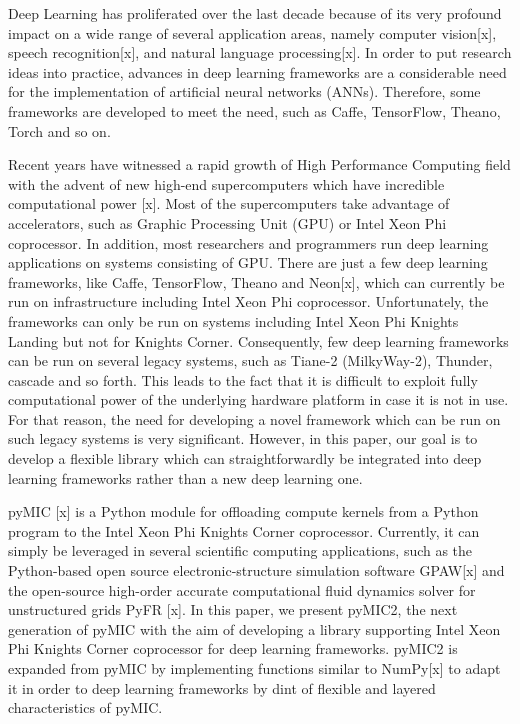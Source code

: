 Deep Learning has proliferated over the last decade because of its very profound impact on a wide range of several application areas, namely computer vision[x], speech recognition[x], and natural language processing[x]. In order to put research ideas into practice, advances in deep learning frameworks are a considerable need for the implementation of artificial neural networks (ANNs). Therefore, some frameworks are developed to meet the need, such as Caffe, TensorFlow, Theano, Torch and so on. 

Recent years have witnessed a rapid growth of High Performance Computing field with the advent of new high-end supercomputers which have incredible computational power [x]. Most of the supercomputers take advantage of accelerators, such as Graphic Processing Unit (GPU) or Intel Xeon Phi coprocessor. In addition, most researchers and programmers run deep learning applications on systems consisting of GPU. There are just a few deep learning frameworks, like Caffe, TensorFlow, Theano and Neon[x], which can currently be run on infrastructure including Intel Xeon Phi coprocessor. Unfortunately, the frameworks can only be run on systems including Intel Xeon Phi Knights Landing but not for Knights Corner. Consequently, few deep learning frameworks can be run on several legacy systems, such as Tiane-2 (MilkyWay-2), Thunder, cascade and so forth. This leads to the fact that it is difficult to exploit fully computational power of the underlying hardware platform in case it is not in use. For that reason, the need for developing a novel framework which can be run on such legacy systems is very significant. However, in this paper, our goal is to develop a flexible library which can straightforwardly be integrated into deep learning frameworks rather than a new deep learning one.

pyMIC [x] is a Python module for offloading compute kernels from a Python program to the Intel Xeon Phi Knights Corner coprocessor. Currently, it can simply be leveraged in several scientific computing applications, such as the Python-based open source electronic-structure simulation software GPAW[x] and the open-source high-order accurate computational fluid dynamics solver for unstructured grids PyFR [x]. In this paper, we present pyMIC2, the next generation of pyMIC with the aim of developing a library supporting Intel Xeon Phi Knights Corner coprocessor for deep learning frameworks. pyMIC2 is expanded from pyMIC by implementing functions similar to NumPy[x] to adapt it in order to deep learning frameworks by dint of flexible and layered characteristics of pyMIC. 

